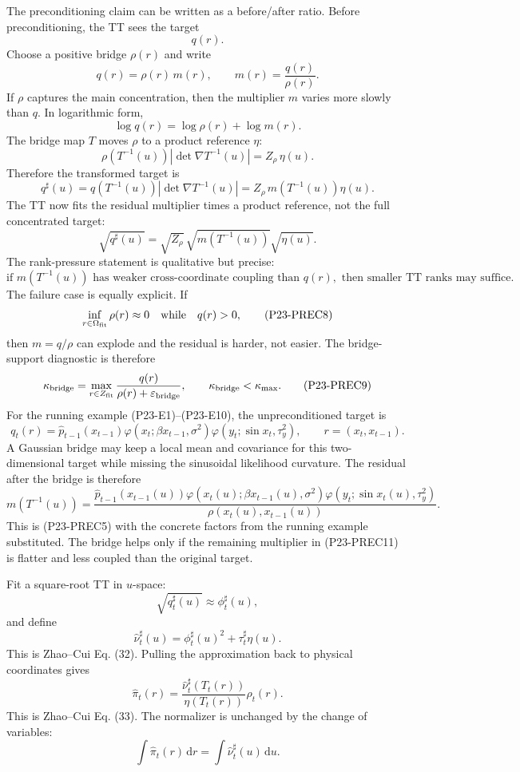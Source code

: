 \documentclass[11pt]{article}
\newcommand{\dd}{\,\mathrm d}
\begin{document}
The preconditioning claim can be written as a before/after ratio.  Before
preconditioning, the TT sees the target
\[
    q(r).
    \tag{P23-PREC1}
\]
Choose a positive bridge \(\rho(r)\) and write
\[
    q(r)=\rho(r)\,m(r),
    \qquad
    m(r)=\frac{q(r)}{\rho(r)}.
    \tag{P23-PREC2}
\]
If \(\rho\) captures the main concentration, then the multiplier \(m\) varies
more slowly than \(q\).  In logarithmic form,
\[
    \log q(r)=\log\rho(r)+\log m(r).
    \tag{P23-PREC3}
\]
The bridge map \(T\) moves \(\rho\) to a product reference \(\eta\):
\[
    \rho(T^{-1}(u))\left|\det\nabla T^{-1}(u)\right|
    =
    Z_\rho\,\eta(u).
    \tag{P23-PREC4}
\]
Therefore the transformed target is
\[
    q^\sharp(u)
    =
    q(T^{-1}(u))\left|\det\nabla T^{-1}(u)\right|
    =
    Z_\rho\,m(T^{-1}(u))\eta(u).
    \tag{P23-PREC5}
\]
The TT now fits the residual multiplier times a product reference, not the
full concentrated target:
\[
    \sqrt{q^\sharp(u)}
    =
    \sqrt{Z_\rho}\,
    \sqrt{m(T^{-1}(u))}
    \sqrt{\eta(u)}.
    \tag{P23-PREC6}
\]
The rank-pressure statement is qualitative but precise:
\[
    \text{if }m(T^{-1}(u))\text{ has weaker cross-coordinate coupling than }q(r),
    \text{ then smaller TT ranks may suffice.}
    \tag{P23-PREC7}
\]
The failure case is equally explicit.  If
\[
    \inf_{r\in\Omega_{\rm fit}}\rho(r)\approx0
    \quad\text{while}\quad q(r)>0,
    \tag{P23-PREC8}
\]
then \(m=q/\rho\) can explode and the residual is harder, not easier.  The
bridge-support diagnostic is therefore
\[
    \kappa_{\rm bridge}
    =
    \max_{r\in Z_{\rm fit}}\frac{q(r)}{\rho(r)+\varepsilon_{\rm bridge}},
    \qquad
    \kappa_{\rm bridge}<\kappa_{\max}.
    \tag{P23-PREC9}
\]
For the running example (P23-E1)--(P23-E10), the unpreconditioned target is
\[
    q_t(r)
    =
    \widehat p_{t-1}(x_{t-1})
    \varphi(x_t;\beta x_{t-1},\sigma^2)
    \varphi(y_t;\sin x_t,\tau_y^2),
    \qquad
    r=(x_t,x_{t-1}).
    \tag{P23-PREC10}
\]
A Gaussian bridge may keep a local mean and covariance for this
two-dimensional target while missing the sinusoidal likelihood curvature.  The
residual after the bridge is therefore
\[
    m(T^{-1}(u))
    =
    \frac{
    \widehat p_{t-1}(x_{t-1}(u))
    \varphi(x_t(u);\beta x_{t-1}(u),\sigma^2)
    \varphi(y_t;\sin x_t(u),\tau_y^2)}
    {\rho(x_t(u),x_{t-1}(u))}.
    \tag{P23-PREC11}
\]
This is (P23-PREC5) with the concrete factors from the running example
substituted.  The bridge helps only if the remaining multiplier in
(P23-PREC11) is flatter and less coupled than the original target.

Fit a square-root TT in \(u\)-space:
\[
    \sqrt{q^\sharp_t(u)}\approx \phi^\sharp_t(u),
\]
and define
\[
    \widehat\nu^\sharp_t(u)
    =
    \phi^\sharp_t(u)^2+\tau^\sharp_t\eta(u).
    \tag{P3}
\]
This is Zhao--Cui Eq. (32).  Pulling the approximation back to physical
coordinates gives
\[
    \widehat\pi_t(r)
    =
    \frac{\widehat\nu^\sharp_t(T_t(r))}
    {\eta(T_t(r))}
    \rho_t(r).
    \tag{P4}
\]
This is Zhao--Cui Eq. (33).  The normalizer is unchanged by the change of
variables:
\[
    \int \widehat\pi_t(r)\dd r
    =
    \int \widehat\nu^\sharp_t(u)\dd u.
    \tag{P5}
\]
\end{document}
